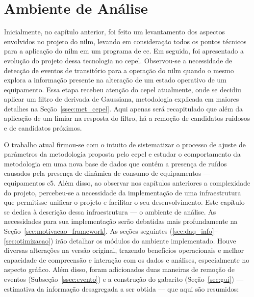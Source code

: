 \chapter{Ambiente de Análise}
\label{chap:framework}


Inicialmente, no capítulo anterior, foi feito um levantamento dos
aspectos envolvidos no projeto do \acs{nilm}, levando em consideração
todos os pontos técnicos para a aplicação do \acs{nilm} em um programa
de \acs{ee}. Em seguida, foi apresentado a evolução do projeto dessa
tecnologia no \acs{cepel}.  Observou-se a necessidade de detecção de
eventos de transitório para a operação do \acs{nilm} quando o mesmo
explora a informação presente na alteração de um estado operativo de
um equipamento. Essa etapa recebeu atenção do \acs{cepel} atualmente,
onde se decidiu aplicar um filtro de derivada de Gaussiana,
metodologia explicada em maiores detalhes na
Seção~\ref{ssec:met_cepel}. Aqui apenas será recapitulado que além da
aplicação de um limiar na resposta do filtro, há a remoção de
candidatos ruidosos e de candidatos próximos.

O trabalho atual firmou-se com o intuito de sistematizar o processo de
ajuste de parâmetros da metodologia proposta pelo \acs{cepel} e
estudar o comportamento da metodologia em uma nova base de dados que
contém a presença de ruídos causados pela presença de dinâmica de
consumo de equipamentos --- equipamentos \acs{c5}. Além
disso, ao observar nos capítulos anteriores a complexidade do projeto,
percebeu-se a necessidade da implementação de uma infraestrutura que
permitisse unificar o projeto e facilitar o seu desenvolvimento. Este
capítulo se dedica à descrição dessa infraestrutura --- o ambiente de
análise. As necessidades para sua implementação serão debatidas mais
profundamente na Seção~\ref{sec:motivacao_framework}. As seções
seguintes (\ref{sec:daq_info}--\ref{sec:otimizacao}) irão detalhar os
módulos do ambiente implementado. Houve diversas alterações na versão
original, trazendo benefícios operacionais e melhor capacidade de
compreensão e interação com os dados e análises, especialmente no
aspecto gráfico. Além disso, foram adicionados duas maneiras de
remoção de eventos (Subseção~\ref{ssec:evento}) e a construção do
gabarito (Seção~\ref{sec:gui}) --- estimativa da informação
desagregada a ser obtida --- que aqui são resumidos:

